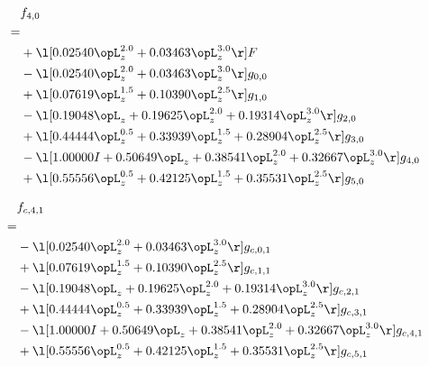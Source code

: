 \begin{alignat}{2} 
\label{eq:f_40_0} 
& f_{4,0} \nonumber \\ 
 = \\ 
& + \l[  0.02540 \opL_z^{2.0} +  0.03463 \opL_z^{3.0}  \r] F \nonumber \\ 
& - \l[  0.02540 \opL_z^{2.0} +  0.03463 \opL_z^{3.0}  \r] g_{0,0} \nonumber \\ 
& + \l[  0.07619 \opL_z^{1.5} +  0.10390 \opL_z^{2.5}  \r] g_{1,0} \nonumber \\ 
& - \l[  0.19048 \opL_z +  0.19625 \opL_z^{2.0} +  0.19314 \opL_z^{3.0}  \r] g_{2,0} \nonumber \\ 
& + \l[  0.44444 \opL_z^{0.5} +  0.33939 \opL_z^{1.5} +  0.28904 \opL_z^{2.5}  \r] g_{3,0} \nonumber \\ 
& - \l[  1.00000 I +  0.50649 \opL_z +  0.38541 \opL_z^{2.0} +  0.32667 \opL_z^{3.0}  \r] g_{4,0} \nonumber \\ 
& + \l[  0.55556 \opL_z^{0.5} +  0.42125 \opL_z^{1.5} +  0.35531 \opL_z^{2.5}  \r] g_{5,0} \nonumber \\ 
\end{alignat} 


\begin{alignat}{2} 
\label{eq:f_41_0} 
& f_{c,4,1} \nonumber \\ 
 = \\ 
& - \l[  0.02540 \opL_z^{2.0} +  0.03463 \opL_z^{3.0}  \r] g_{c,0,1} \nonumber \\ 
& + \l[  0.07619 \opL_z^{1.5} +  0.10390 \opL_z^{2.5}  \r] g_{c,1,1} \nonumber \\ 
& - \l[  0.19048 \opL_z +  0.19625 \opL_z^{2.0} +  0.19314 \opL_z^{3.0}  \r] g_{c,2,1} \nonumber \\ 
& + \l[  0.44444 \opL_z^{0.5} +  0.33939 \opL_z^{1.5} +  0.28904 \opL_z^{2.5}  \r] g_{c,3,1} \nonumber \\ 
& - \l[  1.00000 I +  0.50649 \opL_z +  0.38541 \opL_z^{2.0} +  0.32667 \opL_z^{3.0}  \r] g_{c,4,1} \nonumber \\ 
& + \l[  0.55556 \opL_z^{0.5} +  0.42125 \opL_z^{1.5} +  0.35531 \opL_z^{2.5}  \r] g_{c,5,1} \nonumber \\ 
\end{alignat} 


